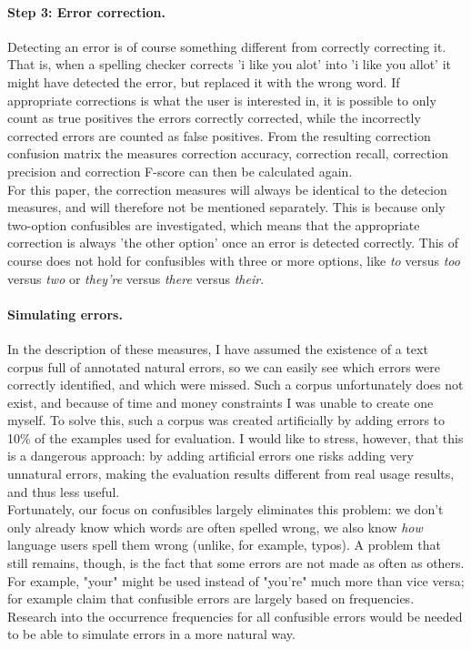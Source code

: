 \documentclass[12pt]{article}
\begin{document}
\paragraph{Step 3: Error correction.} Detecting an error is of course something different from correctly correcting it. That is, when a spelling checker corrects 'i like you alot' into 'i like you allot' it might have detected the error, but replaced it with the wrong word. If appropriate corrections is what the user is interested in, it is possible to only count as true positives the errors correctly corrected, while the incorrectly corrected errors are counted as false positives. From the resulting correction confusion matrix the measures correction accuracy, correction recall, correction precision and correction F-score can then be calculated again. \\\indent
For this paper, the correction measures will always be identical to the detecion measures, and will therefore not be mentioned separately. This is because only two-option confusibles are investigated, which means that the appropriate correction is always 'the other option' once an error is detected correctly. This of course does not hold for confusibles with three or more options, like \emph{to} versus \emph{too} versus \emph{two} or \emph{they're} versus \emph{there} versus \emph{their}.

\paragraph{Simulating errors.} In the description of these measures, I have assumed the existence of a text corpus full of annotated natural errors, so we can easily see which errors were correctly identified, and which were missed. Such a corpus unfortunately does not exist, and because of time and money constraints I was unable to create one myself. To solve this, such a corpus was created artificially by adding errors to 10\% of the examples used for evaluation. I would like to stress, however, that this is a dangerous approach: by adding artificial errors one risks adding very unnatural errors, making the evaluation results different from real usage results, and thus less useful. \\\indent
Fortunately, our focus on confusibles largely eliminates this problem: we don't only already know which words are often spelled wrong, we also know \emph{how} language users spell them wrong (unlike, for example, typos). A problem that still remains, though, is the fact that some errors are not made as often as others. For example, "your" might be used instead of "you're" much more than vice versa; \citet{sfd99} for example claim that confusible errors are largely based on frequencies. Research into the occurrence frequencies for all confusible errors would be needed to be able to simulate errors in a more natural way.
\end{document}
